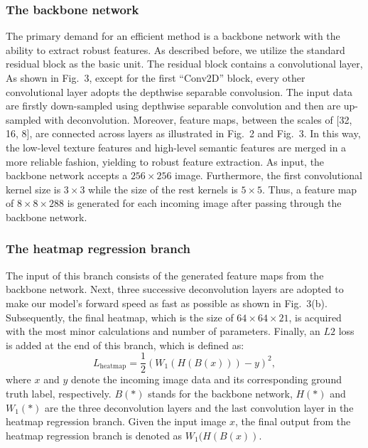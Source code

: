 \documentclass[11pt]{article}
\begin{document}
\subsubsection{The backbone network}
The primary demand for an efficient method is a backbone network with the ability to extract robust features. As described before, we utilize the standard residual block as the basic unit. The residual block contains a convolutional layer, As shown in Fig.\ 3, except for the first ``Conv2D'' block, every other convolutional layer adopts the depthwise separable convolusion. The input data are firstly down-sampled using depthwise separable convolution and then are up-sampled with deconvolution. Moreover, feature maps, between the scales of [32, 16, 8], are connected across layers as illustrated in Fig.\ 2 and Fig.\ 3. In this way, the low-level texture features and high-level semantic features are merged in a more reliable fashion, yielding to robust feature extraction. As input, the backbone network accepts a $256 \times 256$ image. Furthermore, the first convolutional kernel size is $3 \times 3$ while the size of the rest kernels is $5 \times 5$. Thus, a feature map of $8 \times 8 \times 288$ is generated for each incoming image after passing through the backbone network.

\subsubsection{The heatmap regression branch}
The input of this branch consists of the generated feature maps from the backbone network. Next, three successive deconvolution layers are adopted to make our model’s forward speed as fast as possible as shown in Fig.\ 3(b). Subsequently, the final heatmap, which is the size of $64 \times 64 \times 21$, is acquired with the most minor calculations and number of parameters. Finally, an $L2$ loss is added at the end of this branch, which is defined as:
\begin{equation}
L_{\text{heatmap}} = \frac{1}{2}\left(W_{1}\!\left(H(B(x))\right) - y\right)^{2},
\tag{1}
\end{equation}
where $x$ and $y$ denote the incoming image data and its corresponding ground truth label, respectively. $B(\ast)$ stands for the backbone network, $H(\ast)$ and $W_{1}(\ast)$ are the three deconvolution layers and the last convolution layer in the heatmap regression branch. Given the input image $x$, the final output from the heatmap regression branch is denoted as $W_{1}(H(B(x)).$
\end{document}
